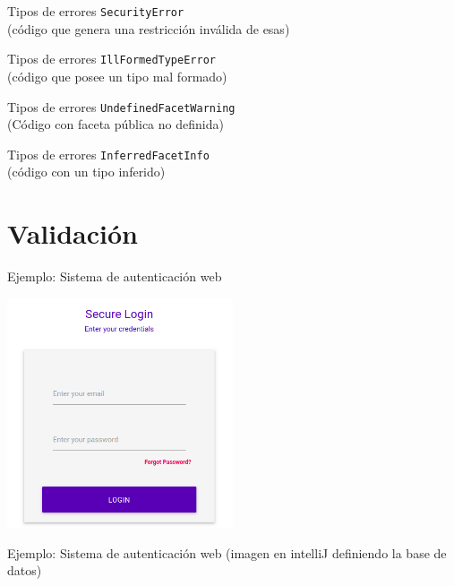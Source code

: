 \documentclass[aspectratio=169,10pt]{beamer}
\begin{document}
\begin{frame}[fragile]{Tipos de errores}
	\texttt{SecurityError} \\ \pause
	(código que genera una restricción inválida de esas)
\end{frame}

\begin{frame}[fragile]{Tipos de errores}
	\texttt{IllFormedTypeError} \\ \pause
	(código que posee un tipo mal formado)
\end{frame}

\begin{frame}[fragile]{Tipos de errores}
	\texttt{UndefinedFacetWarning} \\ \pause
	(Código con faceta pública no definida)
\end{frame}

\begin{frame}[fragile]{Tipos de errores}
	\texttt{InferredFacetInfo} \\ \pause
	(código con un tipo inferido)
\end{frame}

\section{Validación}

\begin{frame}[fragile]{Ejemplo: Sistema de autenticación web}
	\begin{center}
		\includegraphics[width=0.5\textwidth]{images/screen4.png}
	\end{center}
\end{frame}

\begin{frame}[fragile]{Ejemplo: Sistema de autenticación web}
	(imagen en intelliJ definiendo la base de datos)
\end{frame}
\end{document}
